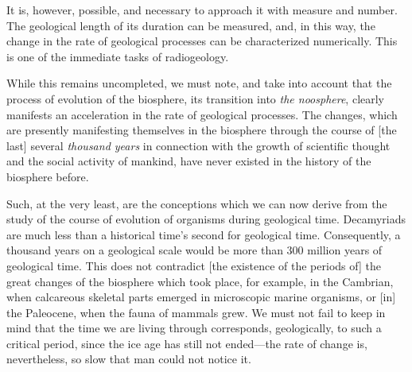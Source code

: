 It is, however, possible, and necessary to approach it with measure and number.
The geological length of its duration can be measured, and, in this way, the
change in the rate of geological processes can be characterized numerically.
This is one of the immediate tasks of radiogeology.


\Section %
While this remains uncompleted, we must note, and take into account that the
process of evolution of the biosphere, its transition into \emph{the
noosphere}, clearly manifests an acceleration in the rate of geological
processes.  The changes, which are presently manifesting themselves in the
biosphere through the course of [the last] several \emph{thousand years} in
connection with the growth of scientific thought and the social activity of
mankind, have never existed in the history of the biosphere before.

Such, at the very least, are the conceptions which we can now derive from the
study of the course of evolution of organisms during geological time.
Decamyriads are much less than a historical time's
second for geological time.  Consequently, a thousand years on a geological
scale would be more than 300 million years of geological time.  This does not
contradict [the existence of the periods of] the great changes of the biosphere which took place, for example, in the
Cambrian, when calcareous skeletal parts emerged in microscopic marine
organisms, or [in] the Paleocene, when the fauna of mammals grew.  We must not fail to keep in mind that the time we are living through
corresponds, geologically, to such a critical period, since the ice age has
still not ended---the rate of change is, nevertheless, so slow that man could
not notice it.

